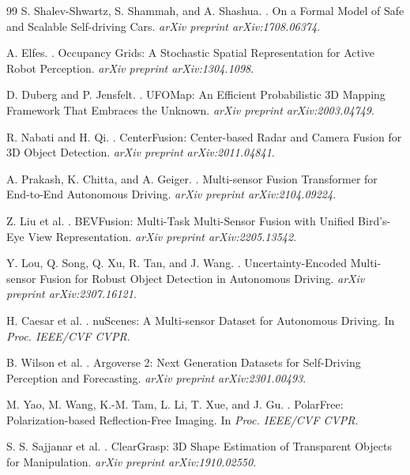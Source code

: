 \documentclass[sigconf,nonacm]{acmart}
\begin{document}
\begin{thebibliography}{99}
S. Shalev-Shwartz, S. Shammah, and A. Shashua.
.
\newblock On a Formal Model of Safe and Scalable Self-driving Cars.
\newblock \textit{arXiv preprint arXiv:1708.06374}.

A. Elfes.
.
\newblock Occupancy Grids: A Stochastic Spatial Representation for Active Robot Perception.
\newblock \textit{arXiv preprint arXiv:1304.1098}.

D. Duberg and P. Jensfelt.
.
\newblock UFOMap: An Efficient Probabilistic 3D Mapping Framework That Embraces the Unknown.
\newblock \textit{arXiv preprint arXiv:2003.04749}.

R. Nabati and H. Qi.
.
\newblock CenterFusion: Center-based Radar and Camera Fusion for 3D Object Detection.
\newblock \textit{arXiv preprint arXiv:2011.04841}.

A. Prakash, K. Chitta, and A. Geiger.
.
\newblock Multi-sensor Fusion Transformer for End-to-End Autonomous Driving.
\newblock \textit{arXiv preprint arXiv:2104.09224}.

Z. Liu et al.
.
\newblock BEVFusion: Multi-Task Multi-Sensor Fusion with Unified Bird's-Eye View Representation.
\newblock \textit{arXiv preprint arXiv:2205.13542}.

Y. Lou, Q. Song, Q. Xu, R. Tan, and J. Wang.
.
\newblock Uncertainty-Encoded Multi-sensor Fusion for Robust Object Detection in Autonomous Driving.
\newblock \textit{arXiv preprint arXiv:2307.16121}.

H. Caesar et al.
.
\newblock nuScenes: A Multi-sensor Dataset for Autonomous Driving.
\newblock In \textit{Proc. IEEE/CVF CVPR}.

B. Wilson et al.
.
\newblock Argoverse 2: Next Generation Datasets for Self-Driving Perception and Forecasting.
\newblock \textit{arXiv preprint arXiv:2301.00493}.

M. Yao, M. Wang, K.-M. Tam, L. Li, T. Xue, and J. Gu.
.
\newblock PolarFree: Polarization-based Reflection-Free Imaging.
\newblock In \textit{Proc. IEEE/CVF CVPR}.

S. S. Sajjanar et al.
.
\newblock ClearGrasp: 3D Shape Estimation of Transparent Objects for Manipulation.
\newblock \textit{arXiv preprint arXiv:1910.02550}.


\end{thebibliography}
\end{document}
